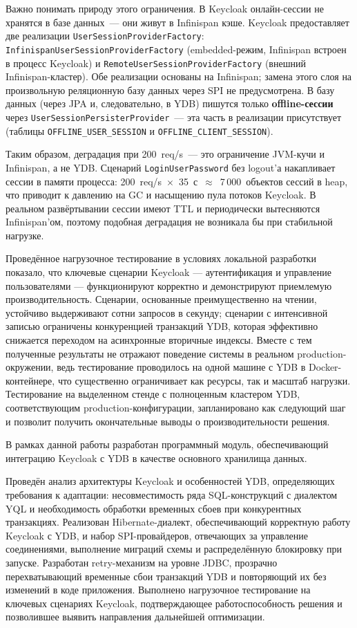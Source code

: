 \documentclass[times]{itmo-student-thesis}
\begin{document}
Важно понимать природу этого ограничения.
В Keycloak онлайн-сессии не хранятся в базе данных~--- они живут в Infinispan кэше.
Keycloak предоставляет две реализации \texttt{UserSessionProviderFactory}:
\texttt{InfinispanUserSessionProviderFactory} (embedded-режим, Infinispan встроен
в процесс Keycloak) и \texttt{RemoteUserSessionProviderFactory} (внешний Infinispan-кластер).
Обе реализации основаны на Infinispan; замена этого слоя на произвольную реляционную
базу данных через SPI не предусмотрена.
В базу данных (через JPA и, следовательно, в YDB) пишутся только \textbf{offline-сессии}
через \texttt{UserSessionPersisterProvider}~--- эта часть в реализации присутствует
(таблицы \texttt{OFFLINE\_USER\_SESSION} и \texttt{OFFLINE\_CLIENT\_SESSION}).

Таким образом, деградация при 200~req/s~--- это ограничение JVM-кучи и Infinispan,
а не YDB.
Сценарий \texttt{LoginUserPassword} без logout'а накапливает сессии в памяти процесса:
200~req/s~$\times$~35~с~$\approx$~7\,000~объектов сессий в heap,
что приводит к давлению на GC и насыщению пула потоков Keycloak.
В реальном развёртывании сессии имеют TTL и периодически вытесняются Infinispan'ом,
поэтому подобная деградация не возникала бы при стабильной нагрузке.

Проведённое нагрузочное тестирование в условиях локальной разработки показало,
что ключевые сценарии Keycloak --- аутентификация и управление пользователями ---
функционируют корректно и демонстрируют приемлемую производительность.
Сценарии, основанные преимущественно на чтении, устойчиво выдерживают
сотни запросов в секунду; сценарии с интенсивной записью ограничены конкуренцией
транзакций YDB, которая эффективно снижается переходом на асинхронные вторичные
индексы.
Вместе с тем полученные результаты не отражают поведение системы в реальном
production-окружении, ведь тестирование проводилось на одной машине с YDB в
Docker-контейнере, что существенно ограничивает как ресурсы, так и масштаб нагрузки.
Тестирование на выделенном стенде с полноценным кластером YDB, соответствующим
production-конфигурации, запланировано как следующий шаг и позволит получить
окончательные выводы о производительности решения.

\startconclusionpage

В рамках данной работы разработан программный модуль, обеспечивающий интеграцию
Keycloak с YDB в качестве основного хранилища данных.

Проведён анализ архитектуры Keycloak и особенностей YDB, определяющих требования
к адаптации: несовместимость ряда SQL-конструкций с диалектом YQL и необходимость
обработки временных сбоев при конкурентных транзакциях.
Реализован Hibernate-диалект, обеспечивающий корректную работу Keycloak с YDB,
и набор SPI-провайдеров, отвечающих за управление соединениями, выполнение миграций
схемы и распределённую блокировку при запуске.
Разработан retry-механизм на уровне JDBC, прозрачно перехватывающий временные сбои
транзакций YDB и повторяющий их без изменений в коде приложения.
Выполнено нагрузочное тестирование на ключевых сценариях Keycloak, подтверждающее
работоспособность решения и позволившее выявить направления дальнейшей оптимизации.
\end{document}
